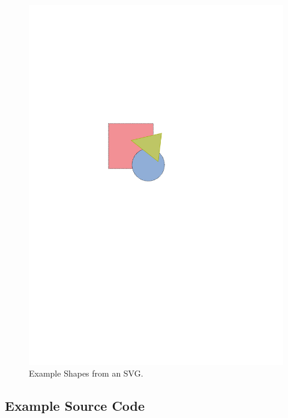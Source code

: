 \documentclass[%
]{tumDiss}
\begin{document}
\begin{figure}[thb]
  \centering
  \includegraphics{shapes}

  \caption{Example Shapes from an SVG.}
  \label{fig:example_svg}
\end{figure}

\lipsum[42]



\subsection{Example Source Code}

\lipsum[1]
\end{document}
